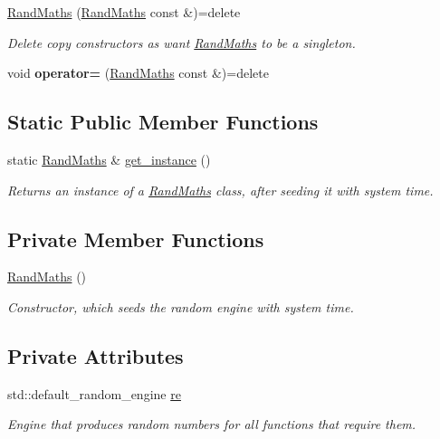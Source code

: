 \begin{DoxyCompactItemize}
\item 
\mbox{\hyperlink{classrcombinator_1_1RandMaths_ac9b350a4aa07b739dcc2bb12c3b5c0e5}{Rand\+Maths}} (\mbox{\hyperlink{classrcombinator_1_1RandMaths}{Rand\+Maths}} const \&)=delete
\begin{DoxyCompactList}\small\item\em Delete copy constructors as want \mbox{\hyperlink{classrcombinator_1_1RandMaths}{Rand\+Maths}} to be a singleton. \end{DoxyCompactList}\item 
\mbox{\label{classrcombinator_1_1RandMaths_ab26d84d79d640cd343ac3e94a70ad184}} 
void {\bfseries operator=} (\mbox{\hyperlink{classrcombinator_1_1RandMaths}{Rand\+Maths}} const \&)=delete
\end{DoxyCompactItemize}

\subsection*{Static Public Member Functions}
\begin{DoxyCompactItemize}
\item 
static \mbox{\hyperlink{classrcombinator_1_1RandMaths}{Rand\+Maths}} \& \mbox{\hyperlink{classrcombinator_1_1RandMaths_ae54dee1a16fb0e275e1624ccaa7dc87e}{get\+\_\+instance}} ()
\begin{DoxyCompactList}\small\item\em Returns an instance of a \mbox{\hyperlink{classrcombinator_1_1RandMaths}{Rand\+Maths}} class, after seeding it with system time. \end{DoxyCompactList}\end{DoxyCompactItemize}
\subsection*{Private Member Functions}
\begin{DoxyCompactItemize}
\item 
\mbox{\hyperlink{classrcombinator_1_1RandMaths_aa507e7465f9a650d560aa42c7f75310f}{Rand\+Maths}} ()
\begin{DoxyCompactList}\small\item\em Constructor, which seeds the random engine with system time. \end{DoxyCompactList}\end{DoxyCompactItemize}
\subsection*{Private Attributes}
\begin{DoxyCompactItemize}
\item 
std\+::default\+\_\+random\+\_\+engine \mbox{\hyperlink{classrcombinator_1_1RandMaths_a69ed49d4f595e927d803d79b0c679ba6}{re}}
\begin{DoxyCompactList}\small\item\em Engine that produces random numbers for all functions that require them. \end{DoxyCompactList}\end{DoxyCompactItemize}


